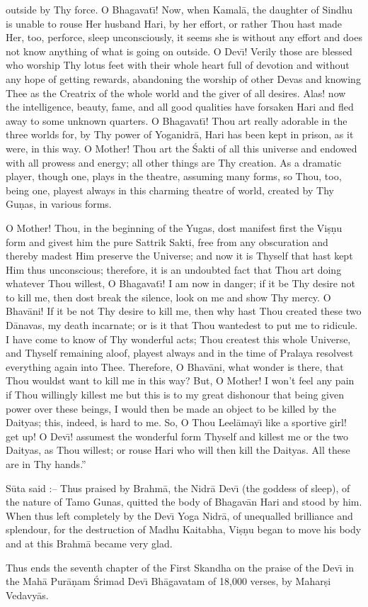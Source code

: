 outside by Thy force. O Bhagavat\={\i}! Now, when Kamal\=a, the daughter of Sindhu is unable to rouse Her husband Hari, by her effort, or rather Thou hast made Her, too, perforce, sleep unconsciously, it seems she is without any effort and does not know anything of what is going on outside. O Dev\={\i}! Verily those are blessed who worship Thy lotus feet with their whole heart full of devotion and without any hope of getting rewards, abandoning the worship of other Devas and knowing Thee as the Creatrix of the whole world and the giver of all desires. Alas! now the intelligence, beauty, fame, and all good qualities have forsaken Hari and fled away to some unknown quarters. O Bhagavat\={\i}! Thou art really adorable in the three worlds for, by Thy power of Yoganidr\=a, Hari has been kept in prison, as it were, in this way. O Mother! Thou art the \'Sakti of all this universe and endowed with all prowess and energy; all other things are Thy creation. As a dramatic player, though one, plays in the theatre, assuming many forms, so Thou, too, being one, playest always in this charming theatre of world, created by Thy Gu\d{n}as, in various forms.

O Mother! Thou, in the beginning of the Yugas, dost manifest first the Vi\d{s}\d{n}u form and givest him the pure Sattrik Sakti, free from any obscuration and thereby madest Him preserve the Universe; and now it is Thyself that hast kept Him thus unconscious; therefore, it is an undoubted fact that Thou art doing whatever Thou willest, O Bhagavat\={\i}! I am now in danger; if it be Thy desire not to kill me, then dost break the silence, look on me and show Thy mercy. O Bhav\=ani! If it be not Thy desire to kill me, then why hast Thou created these two D\=anavas, my death incarnate; or is it that Thou wantedest to put me to ridicule. I have come to know of Thy wonderful acts; Thou createst this whole Universe, and Thyself remaining aloof, playest always and in the time of Pralaya resolvest everything again into Thee. Therefore, O Bhav\=ani, what wonder is there, that Thou wouldst want to kill me in this way? But, O Mother! I won't feel any pain if Thou willingly killest me but this is to my great dishonour that being given power over these beings, I would then be made an object to be killed by the Daityas; this, indeed, is hard to me. So, O Thou Leel\=amay\={\i} like a sportive girl! get up! O Dev\={\i}! assumest the wonderful form Thyself and killest me or the two Daityas, as Thou willest; or rouse Hari who will then kill the Daityas. All these are in Thy hands.''

S\=uta said :-- Thus praised by Brahm\=a, the Nidr\=a Dev\={\i} (the goddess of sleep), of the nature of Tamo Gunas, quitted the body of Bhagav\=an Hari and stood by him. When thus left completely by the Dev\={\i} Yoga Nidr\=a, of unequalled brilliance and splendour, for the destruction of Madhu Kaitabha, Vi\d{s}\d{n}u began to move his body and at this Brahm\=a became very glad.

Thus ends the seventh chapter of the First Skandha on the praise of the Dev\={\i} in the Mah\=a Pur\=a\d{n}am \'Srimad Dev\={\i} Bh\=agavatam of 18,000 verses, by Mahar\d{s}i Vedavy\=as.




